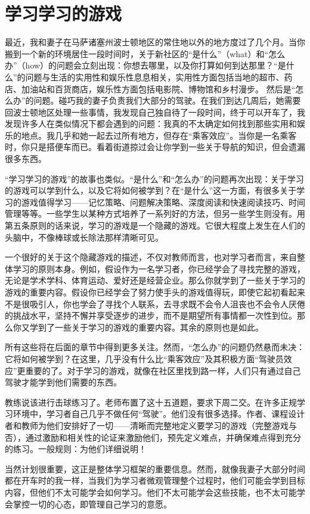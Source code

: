 \chapter{学习学习的游戏}
最近，我和妻子在马萨诸塞州波士顿地区的常住地以外的地方度过了几个月。当你搬到一个新的环境居住一段时间时，关于新社区的“是什么”（what）和“怎么办”（how）的问题会立刻出现：你想去哪里，以及你打算如何到达那里？“是什么”的问题与生活的实用性和娱乐性息息相关，实用性方面包括当地的超市、药店、加油站和百货商店，娱乐性方面包括电影院、博物馆和乡村漫步。
然后是“怎么办”的问题。碰巧我的妻子负责我们大部分的驾驶。在我们到达几周后，她需要回波士顿地区处理一些事情，我发现自己独自待了一段时间，终于可以开车了，我发现许多人在类似情况下都会遇到的问题：我真的不太确定如何找到那些实用和娱乐的地点。我几乎和她一起去过所有地方，但存在“乘客效应”。当你是一名乘客时，你只是搭便车而已。看着街道掠过会让你学到一些关于导航的知识，但会遗漏很多东西。

“学习学习的游戏”的故事也类似。“是什么”和“怎么办”的问题再次出现：关于学习的游戏可以学到什么，以及它将如何被学到？在“是什么”这一方面，有很多关于学习的游戏值得学习——记忆策略、问题解决策略、深度阅读和快速阅读技巧、时间管理等等。一些学生以某种方式培养了一系列好的方法，但另一些学生则没有。用第五条原则的话来说，学习的游戏是一个隐藏的游戏。它很大程度上发生在人们的头脑中，不像棒球或长除法那样清晰可见。

一个很好的关于这个隐藏游戏的描述，不仅对教师而言，也对学习者而言，来自整体学习的原则本身。例如，假设作为一名学习者，你已经学会了寻找完整的游戏，无论是学术学科、体育运动、爱好还是经营企业。那么你就学到了一些关于学习的游戏的重要内容。假设你已经学会了努力使手头的游戏值得玩，即使它起初看起来不是很吸引人，你也学会了寻找个人联系，去寻求既不会令人沮丧也不会令人厌倦的挑战水平，坚持不懈并享受逐步的进步，而不是期望所有事情都一次性到位。那么你又学到了一些关于学习的游戏的重要内容。其余的原则也是如此。

所有这些将在后面的章节中得到更多关注。然而，“怎么办”的问题仍然悬而未决：它将如何被学到？在这里，几乎没有什么比“乘客效应”及其积极方面“驾驶员效应”更重要的了。对于学习的游戏，就像在社区里找到路一样，人们只有通过自己驾驶才能学到他们需要的东西。

教练说该进行击球练习了。老师布置了这十五道题，要求下周二交。在许多正规学习环境中，学习者自己几乎不做任何“驾驶”。他们没有很多选择。作者、课程设计者和教师为他们安排好了一切——清晰而完整地定义要学习的游戏（完整游戏与否），通过激励和相关性的论证来激励他们，预先定义难点，并确保难点得到充分的练习。一般规则：为他们详细说明！

当然计划很重要，这正是整体学习框架的重要信息。然而，就像我妻子大部分时间都在开车时的我一样，当我们为学习者微观管理整个过程时，他们可能会学到目标内容，但他们不太可能学会如何学习。他们不太可能学会这些技能，也不太可能学会掌控一切的心态，即管理自己学习的意愿。

